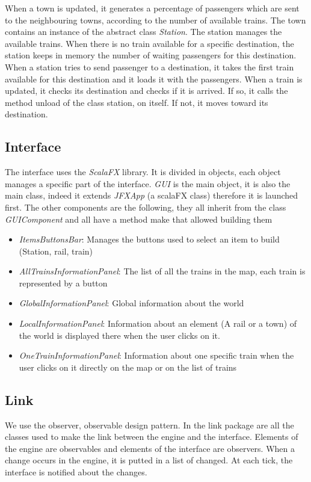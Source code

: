 \documentclass{article}
\begin{document}
When a town is updated, it generates a percentage of passengers which are sent to the neighbouring towns, according to the number of available trains.
The town contains an instance of the abstract class \textit{Station}. 
The station manages the available trains. 
When there is no train available for a specific destination, the station keeps in memory the number of waiting passengers for this destination. 
When a station tries to send passenger to a destination, it takes the first train available for this destination and it loads it with the passengers.
When a train is updated, it checks its destination and checks if it is arrived. 
If so, it calls the method unload of the class station, on itself. 
If not, it moves toward its destination.

\subsection{Interface}
The interface uses the \textit{ScalaFX} library.
It is divided in objects, each object manages a specific part of the interface.
\textit{GUI} is the main object, it is also the main class, indeed it extends \textit{JFXApp} (a scalaFX class) therefore it is launched first.
The other components are the following, they all inherit from the class \textit{GUIComponent} and all have a method make that allowed building them
\begin{itemize}
	\item \textit{ItemsButtonsBar}: Manages the buttons used to select an item to build (Station, rail, train)
	\item \textit{AllTrainsInformationPanel}: The list of all the trains in the map, each train is represented by a button
	\item \textit{GlobalInformationPanel}: Global information about the world
	\item \textit{LocalInformationPanel}: Information about an element (A rail or a town) of the world is displayed there when the user clicks on it.
	\item \textit{OneTrainInformationPanel}: Information about one specific train when the user clicks on it directly on the map or on the list of trains
\end{itemize}

\subsection{Link}
We use the observer, observable design pattern.
In the link package are all the classes used to make the link between the engine and the interface.
Elements of the engine are observables and elements of the interface are observers.
When a change occurs in the engine, it is putted in a list of changed.
At each tick, the interface is notified about the changes.
\end{document}
